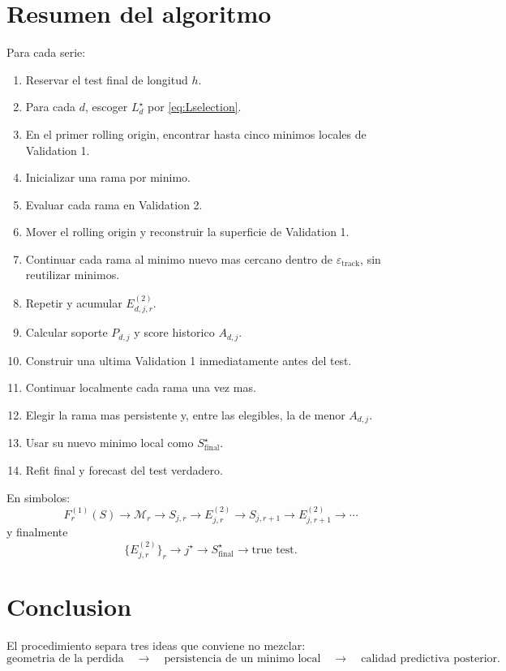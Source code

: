\documentclass[11pt]{article}
\begin{document}
\section{Resumen del algoritmo}

Para cada serie:
\begin{enumerate}[leftmargin=2.4em]
    \item Reservar el test final de longitud \(h\).
    \item Para cada \(d\), escoger \(L_d^\star\) por
    \eqref{eq:Lselection}.
    \item En el primer rolling origin, encontrar hasta cinco minimos locales de
    Validation 1.
    \item Inicializar una rama por minimo.
    \item Evaluar cada rama en Validation 2.
    \item Mover el rolling origin y reconstruir la superficie de Validation 1.
    \item Continuar cada rama al minimo nuevo mas cercano dentro de
    \(\varepsilon_{\mathrm{track}}\), sin reutilizar minimos.
    \item Repetir y acumular \(E^{(2)}_{d,j,r}\).
    \item Calcular soporte \(P_{d,j}\) y score historico \(A_{d,j}\).
    \item Construir una ultima Validation 1 inmediatamente antes del test.
    \item Continuar localmente cada rama una vez mas.
    \item Elegir la rama mas persistente y, entre las elegibles, la de menor
    \(A_{d,j}\).
    \item Usar su nuevo minimo local como \(S_{\mathrm{final}}^\star\).
    \item Refit final y forecast del test verdadero.
\end{enumerate}

En simbolos:
\[
F^{(1)}_r(S)
\to
\mathcal{M}_r
\to
S_{j,r}
\to
E^{(2)}_{j,r}
\to
S_{j,r+1}
\to
E^{(2)}_{j,r+1}
\to
\cdots
\]
y finalmente
\[
\{E^{(2)}_{j,r}\}_r
\to
j^\star
\to
S_{\mathrm{final}}^\star
\to
\text{true test}.
\]

\section{Conclusion}

El procedimiento separa tres ideas que conviene no mezclar:
\[
\text{geometria de la perdida}
\quad
\longrightarrow
\quad
\text{persistencia de un minimo local}
\quad
\longrightarrow
\quad
\text{calidad predictiva posterior}.
\]
\end{document}
